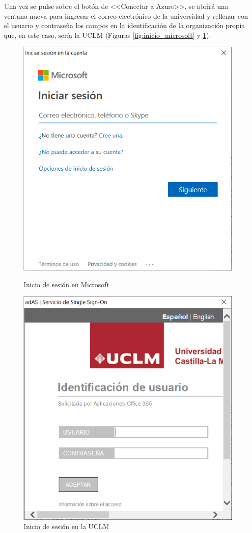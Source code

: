 \clearpage

Una vez se pulse sobre el botón de <<Conectar a Azure>>, se abrirá una ventana nueva para ingresar el correo electrónico de la universidad y rellenar con el usuario y contraseña los campos en la identificación de la organización propia que, en este caso, sería la \acs{UCLM} (Figuras \ref{fig:inicio_microsoft} y \ref{fig:inicio_uclm}).

\begin{figure}
    \centering
    \begin{minipage}{.5\textwidth}
        \centering
        \includegraphics[width=0.8\linewidth]{figures/images/script/inicio_microsoft.PNG}
        \caption{Inicio de sesión en Microsoft}
        \label{fig:inicio_microsoft}
    \end{minipage}%
    \begin{minipage}{.5\textwidth}
        \centering
        \includegraphics[width=0.8\linewidth]{figures/images/script/inicio_uclm.PNG}
        \caption{Inicio de sesión en la \acs{UCLM}}
        \label{fig:inicio_uclm}
    \end{minipage}
\end{figure}

